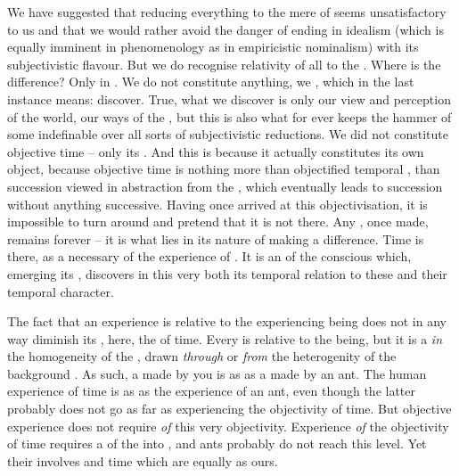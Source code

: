 
We have suggested that reducing everything to the mere  of
 seems unsatisfactory to us and that we would rather avoid
the danger of ending in idealism (which is equally imminent in phenomenology as
in empiricistic nominalism) with its subjectivistic flavour. But we do recognise
relativity of all  to the . Where is the
difference? Only in . We do not constitute anything, we
, which in the last instance means: discover. True, what we
discover is only our view and perception of the world, our ways of
 the , but this is also what for ever keeps
the hammer of some indefinable  over all sorts of
subjectivistic reductions.  We did not constitute {objective} time -- only its
. And this  is  because it
actually constitutes its own object, because objective time is nothing more than
objectified temporal , than succession viewed in abstraction from
the , which eventually leads to succession without
anything successive. Having once arrived at this objectivisation,
it is impossible to turn around and pretend that it is not there. Any
, once made, remains forever -- it is what lies in its nature of
making a difference. Time is there, as a necessary  of the experience
of . It is an  of the conscious 
which, emerging  its , discovers in this very
 both its temporal relation to these  and their temporal
character.

The fact that an experience is relative to the experiencing being does not in
any way diminish its , here, the  of time.
Every  is relative to the  being, but it is a
 {\em in} the homogeneity of the , drawn {\em
through} or {\em from} the heterogenity of the background .  As such,
a  made by you is as  as a  made
by an ant.  The human experience of time is as  as the experience
of an ant, even though the latter probably does not go as far as experiencing
the {objectivity} of time.  But objective experience does not require  {\em of} this very objectivity. Experience {\em of} the
{objectivity} of time requires a  of the
 into , and ants probably do not reach this
level.  Yet their  involves  and time which are
equally  as ours.

